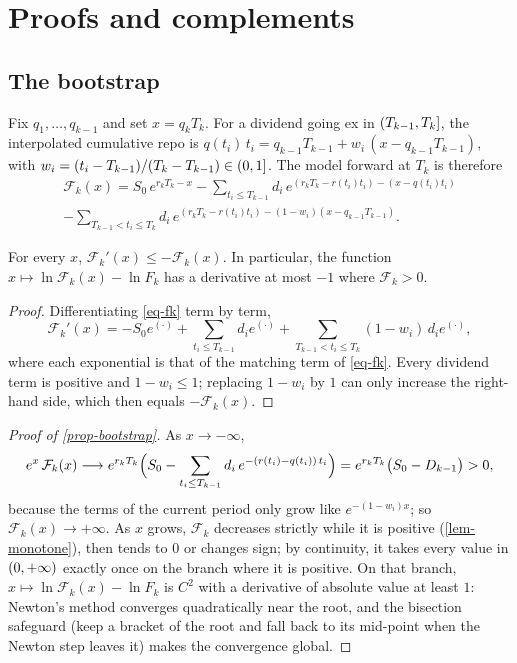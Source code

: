 \section{Proofs and complements}\label{app-proofs}

\subsection{The bootstrap}\label{app-bootstrap}
Fix $q_1, \dots, q_{k-1}$ and set $x=q_kT_k$. For a dividend going ex in $\mathopen{(}T_{k-1}, T_k\mathclose{]}$, the interpolated
cumulative repo is $q(t_i)\,t_i=q_{k-1}T_{k-1}+w_i\,(x-q_{k-1}T_{k-1})$, with
$w_i=(t_i-T_{k-1})/(T_k-T_{k-1})\in\mathopen{(}0, 1\mathclose{]}$. The model forward at $T_k$ is therefore
\begin{multline}\label{eq-fk}
\mathcal F_k(x)=S_0\,e^{r_kT_k-x}-\sum_{t_i\le T_{k-1}}d_i\,e^{(r_kT_k-r(t_i)t_i)-(x-q(t_i)t_i)}\\
-\sum_{T_{k-1}<t_i\le T_k}d_i\,e^{(r_kT_k-r(t_i)t_i)-(1-w_i)(x-q_{k-1}T_{k-1})} .
\end{multline}

\begin{lemma}[Monotonicity]\label{lem-monotone}
For every $x$, $\mathcal F_k'(x)\le-\mathcal F_k(x)$. In particular, the function $x\mapsto\ln\mathcal F_k(x)-\ln F_k$
has a derivative at most $-1$ where $\mathcal F_k>0$.
\end{lemma}
\begin{proof}
Differentiating \eqref{eq-fk} term by term,
\[
\mathcal F_k'(x)=-S_0e^{(\cdot)}+\sum_{t_i\le T_{k-1}}d_ie^{(\cdot)}+\sum_{T_{k-1}<t_i\le T_k}(1-w_i)\,d_ie^{(\cdot)},
\]
where each exponential is that of the matching term of \eqref{eq-fk}. Every dividend term is positive and $1-w_i\le1$;
replacing $1-w_i$ by $1$ can only increase the right-hand side, which then equals $-\mathcal F_k(x)$.
\end{proof}

\begin{proof}[Proof of \cref{prop-bootstrap}]
As $x\to-\infty$,
\[
e^{x}\,\mathcal F_k(x)\longrightarrow e^{r_kT_k}\Bigl(S_0-\sum_{t_i\le T_{k-1}}d_i\,e^{-(r(t_i)-q(t_i))\,t_i}\Bigr)
=e^{r_kT_k}\bigl(S_0-D_{k-1}\bigr)>0,
\]
because the terms of the current period only grow like $e^{-(1-w_i)x}$; so $\mathcal F_k(x)\to+\infty$. As $x$ grows,
$\mathcal F_k$ decreases strictly while it is positive (\cref{lem-monotone}), then tends to $0$ or changes sign; by
continuity, it takes every value in $\mathopen{(}0, +\infty\mathclose{)}$ exactly once on the branch where it is positive. On that
branch, $x\mapsto\ln\mathcal F_k(x)-\ln F_k$ is $C^2$ with a derivative of absolute value at least $1$: Newton's method
converges quadratically near the root, and the bisection safeguard (keep a bracket of the root and fall back to its
mid-point when the Newton step leaves it) makes the convergence global.
\end{proof}

